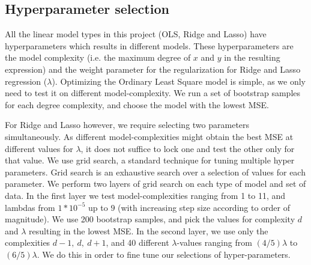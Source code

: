 

\subsection{Hyperparameter selection}
All the linear model types in this project (OLS, Ridge and Lasso) have hyperparameters which results in different models. 
These hyperparameters are the model complexity (i.e. the maximum degree of $x$ and $y$ in the resulting expression) and the weight parameter for the regularization for Ridge and Lasso regression ($\lambda$). 
Optimizing the Ordinary Least Square model is simple, as we only need to test it on different model-complexity. 
We run a set of bootstrap samples for each degree complexity, and choose the model with the lowest MSE.

For Ridge and Lasso however, we require selecting two parameters simultaneously. As different model-complexities might obtain the best MSE at different values for $\lambda$, it does not suffice to lock one and test the other only for that value. 
We use grid search, a standard technique for tuning multiple hyper parameters. \cite{grid_search} 
Grid search is an exhaustive search over a selection of values for each parameter. 
We perform two layers of grid search on each type of model and set of data. 
In the first layer we test model-complexities ranging from 1 to 11, and lambdas from $1*10^{-5}$ up to $9$ (with increasing step size according to order of magnitude). 
We use 200 bootstrap samples, and pick the values for complexity $d$ and $\lambda$ resulting in the lowest MSE. 
In the second layer, we use only the complexities $d-1,\ d,\ d+1$, and 40 different $\lambda$-values ranging from $(4/5)\lambda$ to $(6/5)\lambda$. 
We do this in order to fine tune our selections of hyper-parameters.
\gaute{}